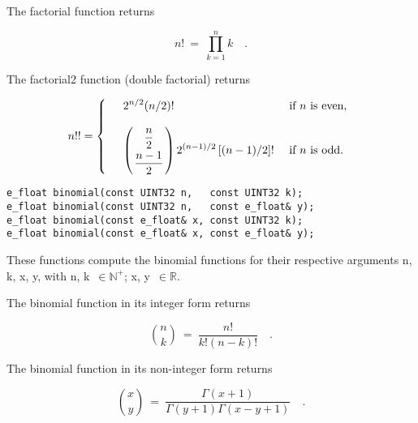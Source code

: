 \vspace{6.0pt}

 The {\courier factorial} function
returns~\cite{wolframfunctions:website}

\begin{equation}
n! \ = \ \prod_{k=1}^{n} k\quad.
\end{equation}

 The {\courier factorial2} function (double factorial)
returns~\cite{wiki:website}

\begin{equation}
n!! = \left\{ \begin{array}{lll}
 &\displaystyle 2^{n/2} (n/2)! &\mbox{ if $n$ is even,} \\ \\
 &\displaystyle \left({\genfrac{}{}{0pt}{0}{\dfrac{n}{2}}{\dfrac{n-1}{2}}}\right) 2^{(n-1)/2}
 \left[(n-1)/2\right]! &\mbox{ if $n$ is odd.}
       \end{array} \right.
\end{equation}

\begin{lstlisting}
e_float binomial(const UINT32 n,   const UINT32 k);
e_float binomial(const UINT32 n,   const e_float& y);
e_float binomial(const e_float& x, const UINT32 k);
e_float binomial(const e_float& x, const e_float& y);
\end{lstlisting}

\vspace{6.0pt}

 These functions compute the binomial functions
for their respective arguments {\courier n}, {\courier k}, {\courier x}, {\courier y},
with {\courier n}, {\courier k}~$\in\mathbb{N}^{+}$;
{\courier x}, {\courier y}~$\in\mathbb{R}$.

\vspace{6.0pt}

 The {\courier binomial} function in its integer form
returns~\cite{wolframfunctions:website}

\begin{equation}
\binom{n}{k} \ = \ \frac{n!}{k! (n-k)!}\quad.
\end{equation}

 The {\courier binomial} function in its non-integer form
returns~\cite{wolframfunctions:website}

\begin{equation}
\binom{x}{y} \ = \ \frac{\Gamma(x+1)}{\Gamma(y+1) \Gamma(x-y+1)}\quad.
\end{equation}

